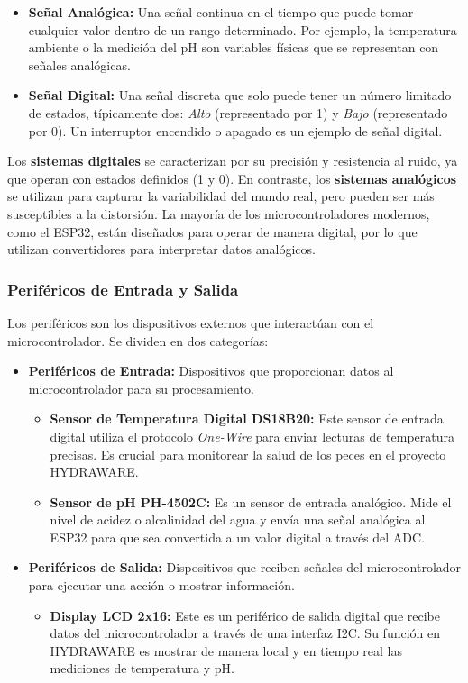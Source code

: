 \documentclass[a4paper,12pt]{article}
\begin{document}
	\begin{itemize}
		\item \textbf{Señal Analógica:} Una señal continua en el tiempo que puede tomar cualquier valor dentro de un rango determinado. Por ejemplo, la temperatura ambiente o la medición del pH son variables físicas que se representan con señales analógicas.
		\item \textbf{Señal Digital:} Una señal discreta que solo puede tener un número limitado de estados, típicamente dos: \textit{Alto} (representado por 1) y \textit{Bajo} (representado por 0). Un interruptor encendido o apagado es un ejemplo de señal digital.
	\end{itemize}
	
	Los \textbf{sistemas digitales} se caracterizan por su precisión y resistencia al ruido, ya que operan con estados definidos (1 y 0). En contraste, los \textbf{sistemas analógicos} se utilizan para capturar la variabilidad del mundo real, pero pueden ser más susceptibles a la distorsión. La mayoría de los microcontroladores modernos, como el ESP32, están diseñados para operar de manera digital, por lo que utilizan convertidores para interpretar datos analógicos.
	
	
	
	\subsubsection{Periféricos de Entrada y Salida}
	Los periféricos son los dispositivos externos que interactúan con el microcontrolador. Se dividen en dos categorías:
	
	\begin{itemize}
		\item \textbf{Periféricos de Entrada:} Dispositivos que proporcionan datos al microcontrolador para su procesamiento.
		\begin{itemize}
			\item \textbf{Sensor de Temperatura Digital DS18B20:} Este sensor de entrada digital utiliza el protocolo \textit{One-Wire} para enviar lecturas de temperatura precisas. Es crucial para monitorear la salud de los peces en el proyecto HYDRAWARE.
			\item \textbf{Sensor de pH PH-4502C:} Es un sensor de entrada analógico. Mide el nivel de acidez o alcalinidad del agua y envía una señal analógica al ESP32 para que sea convertida a un valor digital a través del ADC.
		\end{itemize}
		\item \textbf{Periféricos de Salida:} Dispositivos que reciben señales del microcontrolador para ejecutar una acción o mostrar información.
		\begin{itemize}
			\item \textbf{Display LCD 2x16:} Este es un periférico de salida digital que recibe datos del microcontrolador a través de una interfaz I2C. Su función en HYDRAWARE es mostrar de manera local y en tiempo real las mediciones de temperatura y pH.
		\end{itemize}
	\end{itemize}
	
\end{document}
